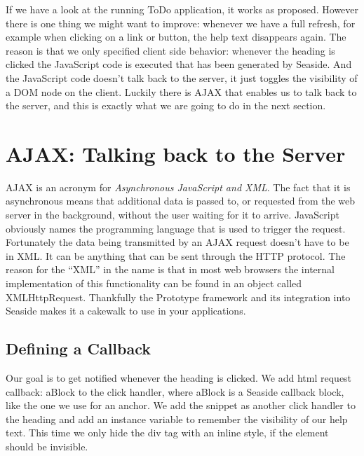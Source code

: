 \documentclass[a4paper,10pt,twoside]{book}
\newcommand{\ct}[1]{{\small\ttfamily\textup{#1}}}
\begin{document}
If we have a look at the running ToDo application, it works as proposed. However there is one thing we might want to improve: whenever we have a full refresh, for example when clicking on a link or button, the help text disappears again. The reason is that we only specified client side behavior: whenever the heading is clicked the JavaScript code is executed that has been generated by Seaside. And the JavaScript code doesn't talk back to the server, it just toggles the visibility of a DOM node on the client. Luckily there is AJAX that enables us to talk back to the server, and this is exactly what we are going to do in the next section.

\section{AJAX: Talking back to the Server}
\label{book:web20:scriptaculous:ajax}

AJAX is an acronym for \textit{Asynchronous JavaScript and XML}. The fact that it is asynchronous means that additional data is passed to, or requested from the web server in the background, without the user waiting for it to arrive. JavaScript obviously names the programming language that is used to trigger the request. Fortunately the data being transmitted by an AJAX request doesn't have to be in XML. It can be anything that can be sent through the HTTP protocol. The reason for the ``XML'' in the name is that in most web browsers the internal implementation of this functionality can be found in an object called \ct{XMLHttpRequest}. Thankfully the Prototype framework and its integration into Seaside makes it a cakewalk to use in your applications.

\subsection{Defining a Callback}
\label{book:web20:scriptaculous:ajax:callback}

Our goal is to get notified whenever the heading is clicked.  We add \ct{html request callback: aBlock} to the click handler, where \ct{aBlock} is a Seaside callback block,
like the one we use for an anchor. We add the snippet as another click handler to the heading and add an instance variable to remember the visibility of our help text. This time we only hide the div tag with an inline style, if the element should be invisible.
\end{document}
